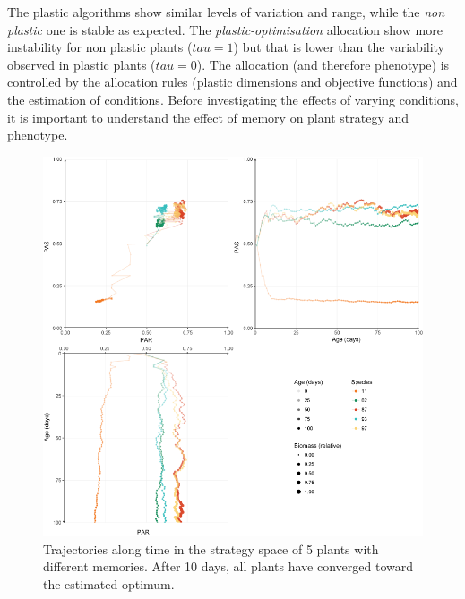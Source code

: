 The plastic algorithms show similar levels of variation and range, while the \textit{non plastic} one is stable as expected. The \textit{plastic-optimisation} allocation show more instability for non plastic plants ($tau = 1$) but that is lower than the variability observed in plastic plants ($tau = 0$). The allocation (and therefore phenotype) is controlled by the allocation rules (plastic dimensions and objective functions) and the estimation of conditions. Before investigating the effects of varying conditions, it is important to understand the effect of memory on plant strategy and phenotype.





\begin{figure}\label{fig:plastic_allocation_trajectory}
\includegraphics[width = \textwidth]{./2_PP/Figures/Individual/memory_effect.png}
\caption{Trajectories along time in the strategy space of 5 plants with different memories. After 10 days, all plants have converged toward the estimated optimum.}
\end{figure}

